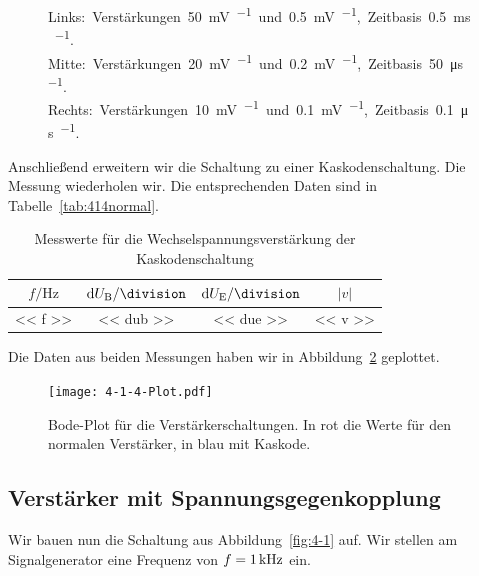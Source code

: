 \begin{figure}[htbp]
\begin{minipage}{.3\linewidth}
	\end{minipage}
	\caption{%
		Links:~Verstärkungen~\SI{50}{\milli\volt\per\division}~und~\SI{.5}{\milli\volt\per\division},~Zeitbasis~\SI{.5}{\milli\second\per\division}.
		Mitte:~Verstärkungen~\SI{20}{\milli\volt\per\division}~und~\SI{.2}{\milli\volt\per\division},~Zeitbasis~\SI{50}{\micro\second\per\division}.
		Rechts:~Verstärkungen~\SI{10}{\milli\volt\per\division}~und~\SI{.1}{\milli\volt\per\division},~Zeitbasis~\SI{.1}{\micro\second\per\division}.
	}
	\label{fig:800}
\end{figure}

Anschließend erweitern wir die Schaltung zu einer Kaskodenschaltung. Die
Messung wiederholen wir. Die entsprechenden Daten sind in
Tabelle~\ref{tab:414normal}.

\begin{table}[htbp]
    \centering
    \begin{tabular}{SSS|S}
        {$f / \si\hertz$} &
        {$\dif\UB / \si\division$} &
        {$\dif\UE / \si\division$} &
        {$|v|$} \\
        \hline
        << f >> & << dub >> & << due >> & << v >> \\
    \end{tabular}
    \caption{%
        Messwerte für die Wechselspannungsverstärkung der Kaskodenschaltung
    }
    \label{tab:414Kaskode}
\end{table}

Die Daten aus beiden Messungen haben wir in Abbildung~\ref{fig:414plot}
geplottet.

\begin{figure}
    \centering
    \texttt{[image: 4-1-4-Plot.pdf]}
    \caption{%
        Bode-Plot für die Verstärkerschaltungen. In rot die Werte für den
        normalen Verstärker, in blau mit Kaskode.
    }
    \label{fig:414plot}
\end{figure}

\fehlt

\FloatBarrier
\subsection{Verstärker mit Spannungsgegenkopplung}

Wir bauen nun die Schaltung aus Abbildung~\ref{fig:4-1} auf. Wir stellen am
Signalgenerator eine Frequenz von $f = \SI 1{\kilo\hertz}$ ein.

